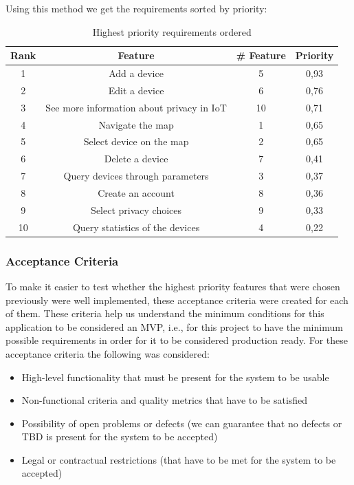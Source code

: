 Using this method we get the requirements sorted by priority:

\begin{table}[H]
    \centering
    \begin{tabular}{|c|c|c|c|}
        \hline
        \rowcolor{gray!50}
        \textbf{Rank} & \textbf{Feature} & \textbf{\# Feature} & \textbf{Priority} \\
        \hline
        1 & Add a device & 5 & 0,93 \\
        \hline
        2 & Edit a device & 6 & 0,76 \\
        \hline
        3 & See more information about privacy in IoT & 10 & 0,71 \\
        \hline
        4 & Navigate the map & 1 & 0,65 \\
        \hline
        5 & Select device on the map & 2 & 0,65 \\
        \hline
        6 & Delete a device & 7 & 0,41 \\
        \hline
        7 & Query devices through parameters & 3 & 0,37 \\
        \hline
        8 & Create an account & 8 & 0,36 \\
        \hline
        9 & Select privacy choices & 9 & 0,33 \\
        \hline
        10 & Query statistics of the devices & 4 & 0,22 \\
        \hline
    \end{tabular}
    \vspace{1em}
    \caption{Highest priority requirements ordered}
    \label{table:sorted requirements}
\end{table}

\subsubsection*{Acceptance Criteria}

To make it easier to test whether the highest priority features that were chosen
previously were well implemented, these acceptance criteria were created for each
of them. These criteria help us understand the minimum conditions for this
application to be considered an MVP, i.e., for this project to have the minimum
possible requirements in order for it to be considered production ready.
\newline
For these acceptance criteria the following was considered:

\begin{itemize}
    \item High-level functionality that must be present for the system to be usable
    \item Non-functional criteria and quality metrics that have to be satisfied
    \item Possibility of open problems or defects (we can guarantee that no defects or TBD is present for the system to be accepted)
    \item Legal or contractual restrictions (that have to be met for the system to be accepted)
\end{itemize}

